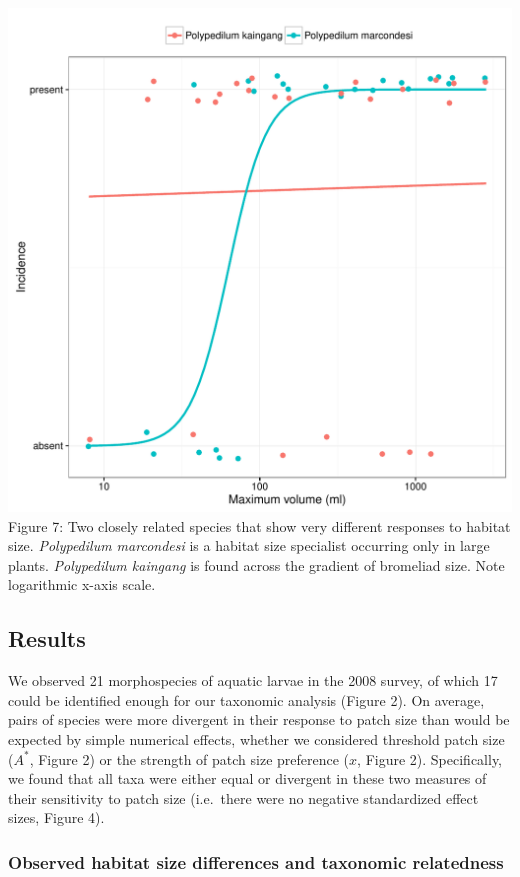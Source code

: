 \includegraphics[width=5.5in]{figures/poly_curve.pdf} Figure 7: Two closely
related species that show very different responses to habitat size.
\emph{Polypedilum marcondesi} is a habitat size specialist occurring
only in large plants. \emph{Polypedilum kaingang} is found across the
gradient of bromeliad size. Note logarithmic x-axis scale.

\subsection{Results}\label{results}

We observed 21 morphospecies of aquatic larvae in the 2008 survey, of
which 17 could be identified enough for our taxonomic analysis (Figure
2). On average, pairs of species were more divergent in their response
to patch size than would be expected by simple numerical effects,
whether we considered threshold patch size (\(A^{*}\), Figure 2) or the
strength of patch size preference (\(x\), Figure 2). Specifically, we
found that all taxa were either equal or divergent in these two measures
of their sensitivity to patch size (i.e.~there were no negative
standardized effect sizes, Figure 4).

\subsubsection{Observed habitat size differences and taxonomic
relatedness}\label{observed-habitat-size-differences-and-taxonomic-relatedness}

